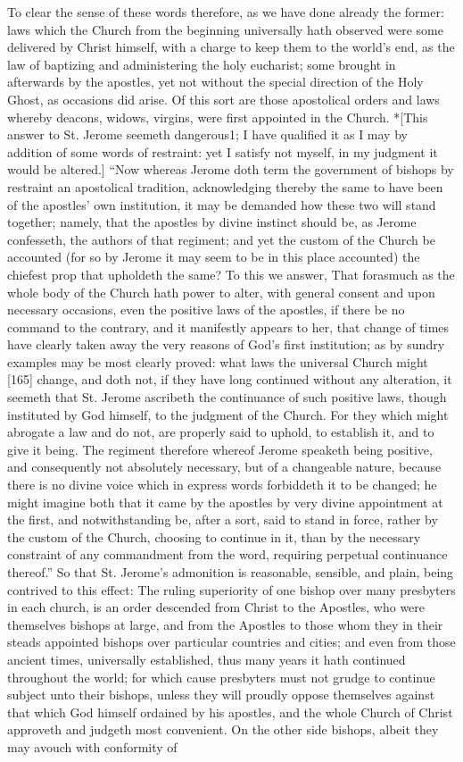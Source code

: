 To clear the sense of these words therefore, as we have done already the former: laws which the Church from the beginning universally hath observed were some delivered by Christ himself, with a charge to keep them to the world’s end, as the law of baptizing and administering the holy eucharist; some brought in afterwards by the apostles, yet not without the special direction of the Holy Ghost, as occasions did arise. Of this sort are those apostolical orders and laws whereby deacons, widows, virgins, were first appointed in the Church. *[This answer to St. Jerome seemeth dangerous1; I have qualified it as I may by addition of some words of restraint: yet I satisfy not myself, in my judgment it would be altered.] “Now whereas Jerome doth term the government of bishops by restraint an apostolical tradition, acknowledging thereby the same to have been of the apostles’ own institution, it may be demanded how these two will stand together; namely, that the apostles by divine instinct should be, as Jerome confesseth, the authors of that regiment; and yet the custom of the Church be accounted (for so by Jerome it may seem to be in this place accounted) the chiefest prop that upholdeth the same? To this we answer, That forasmuch as the whole body of the Church hath power to alter, with general consent and upon necessary occasions, even the positive laws of the apostles, if there be no command to the contrary, and it manifestly appears to her, that change of times have clearly taken away the very reasons of God’s first institution; as by sundry examples may be most clearly proved: what laws the universal Church might [165] change, and doth not, if they have long continued without any alteration, it seemeth that St. Jerome ascribeth the continuance of such positive laws, though instituted by God himself, to the judgment of the Church. For they which might abrogate a law and do not, are properly said to uphold, to establish it, and to give it being. The regiment therefore whereof Jerome speaketh being positive, and consequently not absolutely necessary, but of a changeable nature, because there is no divine voice which in express words forbiddeth it to be changed; he might imagine both that it came by the apostles by very divine appointment at the first, and notwithstanding be, after a sort, said to stand in force, rather by the custom of the Church, choosing to continue in it, than by the necessary constraint of any commandment from the word, requiring perpetual continuance thereof.” So that St. Jerome’s admonition is reasonable, sensible, and plain, being contrived to this effect: The ruling superiority of one bishop over many presbyters in each church, is an order descended from Christ to the Apostles, who were themselves bishops at large, and from the Apostles to those whom they in their steads appointed bishops over particular countries and cities; and even from those ancient times, universally established, thus many years it hath continued throughout the world; for which cause presbyters must not grudge to continue subject unto their bishops, unless they will proudly oppose themselves against that which God himself ordained by his apostles, and the whole Church of Christ approveth and judgeth most convenient. On the other side bishops, albeit they may avouch with conformity of 